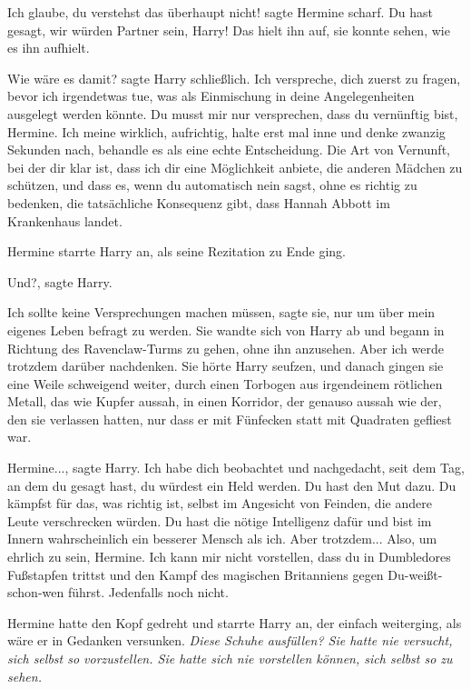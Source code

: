 \glqq{}Ich glaube, du verstehst das überhaupt nicht!\grqq{} sagte Hermine scharf.
\glqq{}Du hast gesagt, wir würden Partner sein, Harry!\grqq{} Das hielt ihn auf,
sie konnte sehen, wie es ihn aufhielt.

\glqq{}Wie wäre es damit?\grqq{} sagte Harry schließlich. \glqq{}Ich verspreche,
dich zuerst zu fragen, bevor ich irgendetwas tue, was als Einmischung in deine
Angelegenheiten ausgelegt werden könnte. Du musst mir nur versprechen, dass du
vernünftig bist, Hermine. Ich meine wirklich, aufrichtig, halte erst mal inne
und denke zwanzig Sekunden nach, behandle es als eine echte Entscheidung. Die
Art von Vernunft, bei der dir klar ist, dass ich dir eine Möglichkeit anbiete,
die anderen Mädchen zu schützen, und dass es, wenn du automatisch nein sagst,
ohne es richtig zu bedenken, die tatsächliche Konsequenz gibt, dass Hannah
Abbott im Krankenhaus landet.\grqq{}

Hermine starrte Harry an, als seine Rezitation zu Ende ging.

\glqq{}Und?\grqq{}, sagte Harry.

\glqq{}Ich sollte keine Versprechungen machen müssen\grqq{}, sagte sie, \glqq{}nur
um über mein eigenes Leben befragt zu werden.\grqq{} Sie wandte sich von Harry
ab und begann in Richtung des Ravenclaw-Turms zu gehen, ohne ihn anzusehen.
\glqq{}Aber ich werde trotzdem darüber nachdenken.\grqq{} Sie hörte Harry
seufzen, und danach gingen sie eine Weile schweigend weiter, durch einen
Torbogen aus irgendeinem rötlichen Metall, das wie Kupfer aussah, in einen
Korridor, der genauso aussah wie der, den sie verlassen hatten, nur dass er mit
Fünfecken statt mit Quadraten gefliest war.

\glqq{}Hermine...\grqq{}, sagte Harry. \glqq{}Ich habe dich beobachtet und
nachgedacht, seit dem Tag, an dem du gesagt hast, du würdest ein Held werden. Du
hast den Mut dazu. Du kämpfst für das, was richtig ist, selbst im Angesicht von
Feinden, die andere Leute verschrecken würden. Du hast die nötige Intelligenz
dafür und bist im Innern wahrscheinlich ein besserer Mensch als ich. Aber
trotzdem... Also, um ehrlich zu sein, Hermine. Ich kann mir nicht vorstellen,
dass du in Dumbledores Fußstapfen trittst und den Kampf des magischen
Britanniens gegen Du-weißt-schon-wen führst. Jedenfalls noch nicht.\grqq{}

Hermine hatte den Kopf gedreht und starrte Harry an, der einfach weiterging, als
wäre er in Gedanken versunken. \emph{Diese Schuhe ausfüllen? Sie hatte nie
versucht, sich selbst so vorzustellen. Sie hatte sich nie vorstellen können,
sich selbst so zu sehen.}

